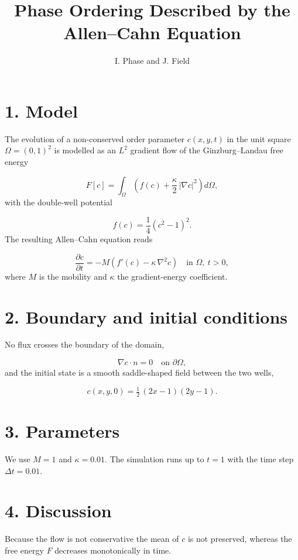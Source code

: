 \documentclass[11pt,a4paper]{article}
\title{Phase Ordering Described by the Allen--Cahn Equation}\author{I. Phase and J. Field}\date{}
\begin{document}
\maketitle
\section*{1. Model}
The evolution of a non-conserved order parameter $c(x,y,t)$ in the unit square $\Omega=(0,1)^2$ is modelled as an $L^2$ gradient flow of the Ginzburg--Landau free energy

\begin{equation}
F[c] = \int_\Omega \left( f(c) + \frac{\kappa}{2}\,|\nabla c|^2 \right) d\Omega ,
\end{equation}
with the double-well potential

\begin{equation}
f(c) = \frac14\left(c^2-1\right)^2 .
\end{equation}
The resulting Allen--Cahn equation reads

\begin{equation}
\frac{\partial c}{\partial t} = -M\left( f'(c) - \kappa\,\nabla^2 c \right) \quad \text{in } \Omega,\ t>0 ,
\end{equation}
where $M$ is the mobility and $\kappa$ the gradient-energy coefficient.

\section*{2. Boundary and initial conditions}
No flux crosses the boundary of the domain,

\begin{equation}
\nabla c\cdot n = 0 \quad \text{on } \partial\Omega ,
\end{equation}
and the initial state is a smooth saddle-shaped field between the two wells,

\begin{equation}
c(x,y,0) = \tfrac12\,(2x-1)(2y-1) .
\end{equation}
\section*{3. Parameters}
We use $M=1$ and $\kappa=0.01$. The simulation runs up to $t=1$ with the time step $\Delta t=0.01$.

\section*{4. Discussion}
Because the flow is not conservative the mean of $c$ is not preserved, whereas the free energy $F$ decreases monotonically in time.
\end{document}
